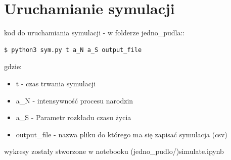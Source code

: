 \documentclass{article}
\begin{document}
\section{Uruchamianie symulacji}
\noindent kod do uruchamiania symulacji - w folderze jedno\_pudla::
\begin{lstlisting}[language=bash]
  $ python3 sym.py t a_N a_S output_file 
\end{lstlisting}
gdzie: \begin{itemize}
\item t - czas trwania symulacji
\item a\_N - intensywność procesu narodzin
\item a\_S - Parametr rozkładu czasu życia
\item output\_file - nazwa pliku do którego ma się zapisać symulacja (csv)
\end{itemize}
wykresy zostały stworzone w notebooku (jedno\_pudlo/)simulate.ipynb
\end{document}
